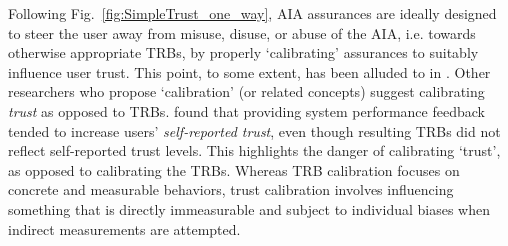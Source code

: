     Following Fig.~\ref{fig:SimpleTrust_one_way}, AIA assurances are ideally designed to steer the user away from misuse, disuse, or abuse of the AIA, i.e. towards otherwise appropriate TRBs, by properly `calibrating' assurances to suitably influence user trust. This point, to some extent, has been alluded to in \cite{Muir1994-ow,Lillard2016-yg,Lee2004-pv,Hutchins2015-if}. Other researchers who propose `calibration' (or related concepts) suggest calibrating \emph{trust} as opposed to TRBs. \citet{Dzindolet2003-ts} found that providing system performance feedback tended to increase users' \textit{self-reported trust}, even though resulting TRBs did not reflect self-reported trust levels. This highlights the danger of calibrating `trust', as opposed to calibrating the TRBs. Whereas TRB calibration focuses on concrete and measurable behaviors, trust calibration involves influencing something that is directly immeasurable and subject to individual biases when indirect measurements are attempted.
